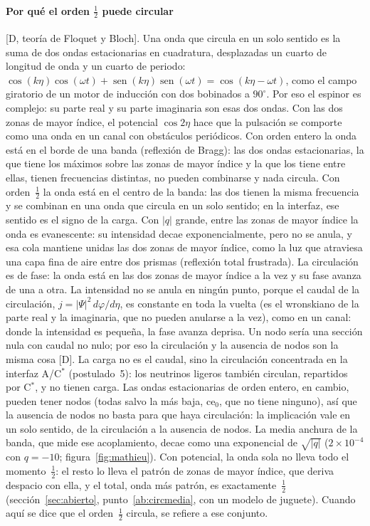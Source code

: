 \documentclass[11pt,a4paper]{article}
\newcommand{\st}[1]{\textup{[#1]}}
\newcommand{\Cst}{C\ensuremath{^{*}}}
\newcommand{\apartado}[1]{\paragraph{#1}}
\begin{document}
\apartado{Por qué el orden $\tfrac12$ puede circular} \st{D, teoría de Floquet y Bloch}. Una onda que circula en un solo sentido es la suma de dos ondas estacionarias en cuadratura, desplazadas un cuarto de longitud de onda y un cuarto de periodo: $\cos(k\eta)\cos(\omega t)+\operatorname{sen}(k\eta)\operatorname{sen}(\omega t)=\cos(k\eta-\omega t)$, como el campo giratorio de un motor de inducción con dos bobinados a $90^\circ$. Por eso el espinor es complejo: su parte real y su parte imaginaria son esas dos ondas. Con las dos zonas de mayor índice, el potencial $\cos2\eta$ hace que la pulsación se comporte como una onda en un canal con obstáculos periódicos. Con orden entero la onda está en el borde de una banda (reflexión de Bragg): las dos ondas estacionarias, la que tiene los máximos sobre las zonas de mayor índice y la que los tiene entre ellas, tienen frecuencias distintas, no pueden combinarse y nada circula. Con orden~$\tfrac12$ la onda está en el centro de la banda: las dos tienen la misma frecuencia y se combinan en una onda que circula en un solo sentido; en la interfaz, ese sentido es el signo de la carga. Con $|q|$ grande, entre las zonas de mayor índice la onda es evanescente: su intensidad decae exponencialmente, pero no se anula, y esa cola mantiene unidas las dos zonas de mayor índice, como la luz que atraviesa una capa fina de aire entre dos prismas (reflexión total frustrada). La circulación es de fase: la onda está en las dos zonas de mayor índice a la vez y su fase avanza de una a otra. La intensidad no se anula en ningún punto, porque el caudal de la circulación, $j=|\Psi|^2\,d\varphi/d\eta$, es constante en toda la vuelta (es el wronskiano de la parte real y la imaginaria, que no pueden anularse a la vez), como en un canal: donde la intensidad es pequeña, la fase avanza deprisa. Un nodo sería una sección nula con caudal no nulo; por eso la circulación y la ausencia de nodos son la misma cosa \st{D}. La carga no es el caudal, sino la circulación concentrada en la interfaz A/\Cst{} (postulado~5): los neutrinos ligeros también circulan, repartidos por \Cst, y no tienen carga. Las ondas estacionarias de orden entero, en cambio, pueden tener nodos (todas salvo la más baja, $\mathrm{ce}_0$, que no tiene ninguno), así que la ausencia de nodos no basta para que haya circulación: la implicación vale en un solo sentido, de la circulación a la ausencia de nodos. La media anchura de la banda, que mide ese acoplamiento, decae como una exponencial de $\sqrt{|q|}$ ($2\times10^{-4}$ con $q=-10$; figura~\ref{fig:mathieu}). Con potencial, la onda sola no lleva todo el momento~$\tfrac12$: el resto lo lleva el patrón de zonas de mayor índice, que deriva despacio con ella, y el total, onda más patrón, es exactamente~$\tfrac12$ (sección~\ref{sec:abierto}, punto~\ref{ab:circmedia}, con un modelo de juguete). Cuando aquí se dice que el orden~$\tfrac12$ circula, se refiere a ese conjunto.
\end{document}
